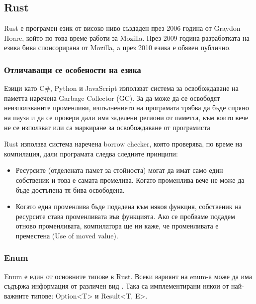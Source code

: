 \subsection{Rust}
Rust е програмен език от високо ниво създаден през 2006 година от Graydon
Hoare, който по това време работи за Mozilla. През 2009 година разработката на
езика бива спонсорирана от Mozilla, a през 2010 езика е обявен публично.
\cite{Rust_Origins_Wikipedia}

\subsubsection{Отличаващи се особености на езика}

Езици като C\#, Python и JavaScript използват система за освобождаване на паметта
наречена Garbage Collector (GC). За да може да се освободят неизползваните
променливи, изпълнението на програмата трябва да бъде спряно на пауза и да се
провери дали има заделени региони от паметта, към които вече не се използват
или са маркиране за освобождаване от програмиста \cite{Garbage_Collection_Wikipedia}

Rust използва система наречена borrow checker, която проверява, по време на
компилация, дали програмата следва следните принципи:

\begin{itemize}

\item Ресурсите (отделената памет за стойноста) могат да имат само един
собственик и това е самата промелива. Когато променлива вече не може да бъде
достъпена тя бива освободена.

\item Когато една променлива бъде подадена към някоя функция, собственик на
ресурсите става променливата във функцията. Ако се пробваме подадем отново
променливата, компилатора ще ни каже, че променливата е преместена (Use of
moved value).

\end{itemize}

\subsubsection{Enum}
Enum е един от основните типове в Rust. Всеки вариянт на enum-а може да има
съдържа информация от различен вид \cite{Rust_Enums}. Така са имплементирани
някои от най-важните типове: Option<T> и Result<T, E>.

